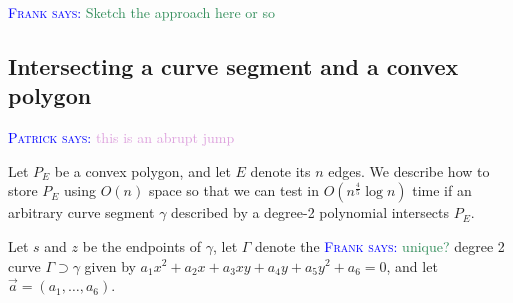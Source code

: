\documentclass[UKenglish]{lipics-v2019}
\newcommand{\myremark}[4]{\textcolor{blue}{\textsc{#1 #2:}} \textcolor{#4}{\textsf{#3}}}
\newcommand{\frank}[2][says]{\myremark{Frank}{#1}{#2}{SeaGreen}}
\newcommand{\patrick}[2][says]{\myremark{Patrick}{#1}{#2}{Plum}}
\begin{document}
\frank{Sketch the approach here or so}

\subsection{Intersecting a curve segment and a convex polygon}
\label{subsec:intersectionsearch}
\patrick{this is an abrupt jump}

Let $P_E$ be a convex polygon, and let $E$ denote its $n$ edges. We
describe how to store $P_E$ using $O(n)$ space so that we can test in
$O(n^{\frac{4}{5}}\log n)$ time if an arbitrary curve segment $\gamma$
described by a degree-2 polynomial intersects
$P_E$. %

Let $s$ and $z$ be the endpoints of $\gamma$, let $\Gamma$ denote the
\frank{unique?} degree 2 curve $\Gamma \supset \gamma$ given by
$a_1 x^2 + a_2 x + a_3 xy + a_4 y + a_5 y^2 + a_6 = 0$, and let
$\vec{a} = (a_1, \ldots, a_6)$. %

\end{document}
